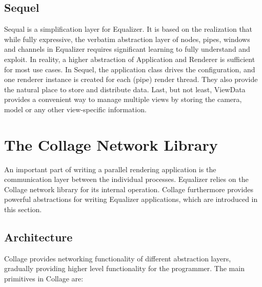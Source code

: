 \documentclass[10pt,journal,compsoc]{IEEEtran}
\begin{document}
\subsection{Sequel}\label{sec:sequel}

Sequal is a simplification layer for Equalizer. It is based on the realization
that while fully expressive, the verbatim abstraction layer of nodes, pipes,
windows and channels in Equalizer requires significant learning to fully
understand and exploit. In reality, a higher abstraction of \textsf{Application}
and \textsf{Renderer} is sufficient for most use cases. In Sequel, the
application class drives the configuration, and one renderer instance is created
for each (pipe) render thread. They also provide the natural place to store and
distribute data. Last, but not least, \textsf{ViewData} provides a convenient
way to manage multiple views by storing the camera, model or any other
view-specific information.

\section{The Collage Network Library}

An important part of writing a parallel rendering application is the
communication layer between the individual processes. Equalizer relies on the
Collage network library for its internal operation. Collage furthermore provides
powerful abstractions for writing Equalizer applications, which are introduced
in this section.

\subsection{Architecture}

Collage provides networking functionality of different abstraction layers,
gradually providing higher level functionality for the programmer. The main
primitives in Collage are:
\end{document}
